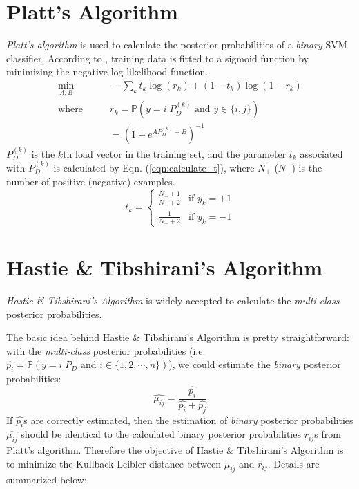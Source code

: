 \documentclass[letterpaper, 11pt]{article}
\theoremstyle{plain}
\theoremstyle{definition}
\begin{document}
\section{Platt's Algorithm} \label{sec:platt_s_algorithm_}
\emph{Platt's algorithm} \cite{Platt1999} is used to calculate the posterior probabilities of a \emph{binary} SVM classifier. According to \cite{Platt1999}, training data is fitted to a sigmoid function by minimizing the negative log likelihood function.
\begin{subequations}
\begin{align}
  \min_{A,B} & \qquad -\sum_k t_k \log(r_k) + (1-t_k)\log(1-r_k) \label{eqn:log_likelihood} \\
  \text{where} & \qquad r_k = \mathbb{P}(y=i | P_D^{(k)} \text{ and } y\in \{i,j\} ) \nonumber \\
    & \qquad = (1+e^{A P_D^{(k)}+B})^{-1} \label{eqn:sigmoid}   
\end{align}
\end{subequations}
$P_D^{(k)}$ is the $k$th load vector in the training set, and the parameter $t_k$ associated with $P_D^{(k)}$ is calculated by Eqn. (\ref{eqn:calculate_t}), where $N_{+}$ ($N_{-}$) is the number of positive (negative) examples.
\begin{equation}
\label{eqn:calculate_t}
t_k = \left\{
\begin{array}{ll}
    \frac{N_+ +1}{N_+ + 2} & \text{if } y_k = +1 \\
    \frac{1}{N_- + 2} & \text{if } y_k = -1
\end{array}
\right.
\end{equation}
\section{Hastie \& Tibshirani's Algorithm} \label{sec:hastie_tibshirani_s_algorithm}
\emph{Hastie \& Tibshirani's Algorithm} \cite{hastie1998classification} is widely accepted to calculate the \emph{multi-class} posterior probabilities. 

The basic idea behind Hastie \& Tibshirani's Algorithm is pretty straightforward: with the \emph{multi-class} posterior probabilities (i.e. $\hat{p_i} = \mathbb{P}(y=i | P_D \text{ and } i \in \{1,2,\cdots,n\} )$), we could estimate the \emph{binary} posterior probabilities:
\begin{equation}
  \hat{\mu_{ij}} = \frac{\hat{p_i}}{\hat{p_i}+\hat{p_j} }
\end{equation}
If $\hat{p_i}$s are correctly estimated, then the estimation of \emph{binary} posterior probabilities $\hat{\mu_{ij}}$ should be identical to the calculated binary posterior probabilities $r_{ij}$s from Platt's algorithm. Therefore the objective of Hastie \& Tibshirani's Algorithm is to minimize the Kullback-Leibler distance between $\hat{\mu_{ij}}$ and $r_{ij}$. Details are summarized below:
\end{document}

